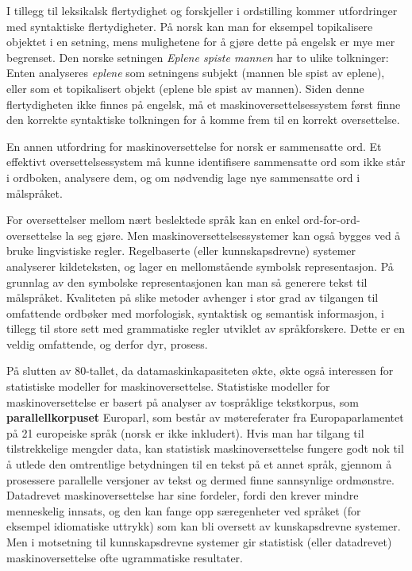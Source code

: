 \begin{multicols}{2}
I tillegg til leksikalsk flertydighet og forskjeller i ordstilling kommer utfordringer med syntaktiske flertydigheter. På norsk kan man for eksempel topikalisere objektet i en setning, mens mulighetene for å gjøre dette på engelsk er mye mer begrenset. Den norske setningen \textit{Eplene spiste mannen} har to ulike tolkninger: Enten analyseres \textit{eplene} som setningens subjekt (mannen ble spist av eplene), eller som et topikalisert objekt (eplene ble spist av mannen). Siden denne flertydigheten ikke finnes på engelsk, må et maskinoversettelsessystem først finne den korrekte syntaktiske tolkningen for å komme frem til en korrekt oversettelse.

En annen utfordring for maskinoversettelse for norsk er sammensatte ord. Et effektivt oversettelsessystem må kunne identifisere sammensatte ord som ikke står i ordboken, analysere dem, og om nødvendig lage nye sammensatte ord i målspråket.

For oversettelser mellom nært beslektede språk kan en enkel ord-for-ord-oversettelse la seg gjøre. Men maskinoversettelsessystemer kan også bygges ved å bruke lingvistiske regler. Regelbaserte (eller kunnskapsdrevne) systemer analyserer kildeteksten, og lager en mellomstående symbolsk representasjon. På grunnlag av den symbolske representasjonen kan man så generere tekst til målspråket. Kvaliteten på slike metoder avhenger i stor grad av tilgangen til omfattende ordbøker med morfologisk, syntaktisk og semantisk informasjon, i tillegg til store sett med grammatiske regler utviklet av  språkforskere. Dette er en veldig omfattende, og derfor dyr, prosess.

På slutten av 80-tallet, da datamaskinkapasiteten økte, økte også interessen for statistiske modeller for maskinoversettelse. Statistiske modeller for maskinoversettelse er basert på analyser av tospråklige tekstkorpus, som \textbf{parallellkorpuset} Europarl, som består av møtereferater fra Europaparlamentet på 21 europeiske språk 
(norsk er ikke inkludert).
Hvis man har tilgang til tilstrekkelige mengder data, kan statistisk maskinoversettelse fungere godt nok til å utlede den omtrentlige betydningen til en tekst på et annet språk, gjennom å prosessere parallelle versjoner av tekst og dermed finne sannsynlige ordmønstre. Datadrevet maskinoversettelse har sine fordeler, fordi den krever mindre menneskelig innsats, og den kan fange opp særegenheter ved språket (for eksempel idiomatiske uttrykk) som kan bli oversett av kunskapsdrevne systemer. Men i motsetning til kunnskapsdrevne systemer gir statistisk (eller datadrevet) maskinoversettelse ofte ugrammatiske resultater.  


\end{multicols}
